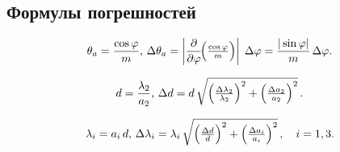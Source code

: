 \subsection{Формулы погрешностей}

\[
	\theta_a = \frac{\cos\varphi}{m}\text{, }
	\Delta\theta_a
	= \left|\frac{\partial}{\partial\varphi}\!\Bigl(\tfrac{\cos\varphi}{m}\Bigr)\right|\;\Delta\varphi
	= \frac{|\sin\varphi|}{m}\,\Delta\varphi.
\]

\[
	d = \frac{\lambda_2}{a_2}\text{, }
	\Delta d
	= d\,\sqrt{\Bigl(\tfrac{\Delta\lambda_2}{\lambda_2}\Bigr)^2
		+\Bigl(\tfrac{\Delta a_2}{a_2}\Bigr)^2}\,.
\]

\[
	\lambda_i = a_i\,d\text{, }
	\Delta\lambda_i
	= \lambda_i\,\sqrt{\Bigl(\tfrac{\Delta d}{d}\Bigr)^2
		+\Bigl(\tfrac{\Delta a_i}{a_i}\Bigr)^2}\,,
	\quad i = 1,3.
\]

